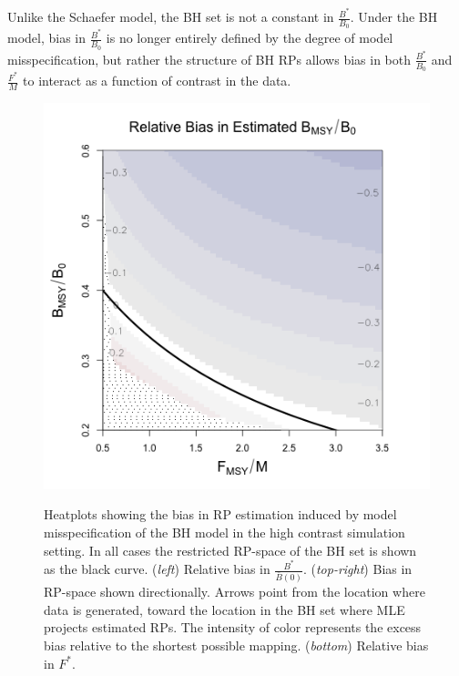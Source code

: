 %
Unlike the Schaefer model, the BH set is not a constant in
$\frac{B^*}{B_0}$. Under the BH model, bias in $\frac{B^*}{B_0}$ is no
longer entirely defined by the degree of model misspecification, but rather the
structure of BH RPs allows bias in both $\frac{B^*}{B_0}$ and $\frac{F^*}{M}$
to interact as a function of contrast in the data.

%
\begin{figure}[h!]
\begin{minipage}[h!]{0.49\textwidth}
\hspace*{-0.5cm}
\includegraphics[width=1.1\textwidth]{../gpBias/zetaRelBiasSchnuteExpT45N150Wide.png}\\
\caption{\label{contrastTrio}
Heatplots showing the bias in RP estimation induced by model misspecification of
the BH model in the high contrast simulation setting.
In all cases the restricted RP-space of the BH set is shown as the black curve.
(\emph{left}) Relative bias in $\frac{B^*}{\bar B(0)}$.  (\emph{top-right})
Bias in RP-space shown directionally. Arrows point from the location where
data is generated, toward the location in the BH set where MLE projects estimated
RPs. The intensity of color represents the excess bias relative
to the shortest possible mapping. (\emph{bottom}) Relative bias in $F^*$.
}
\end{minipage}
\end{figure}
